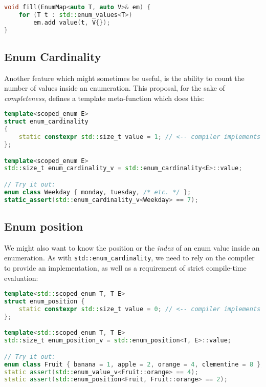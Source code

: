 \documentclass[
  format=manuscript,
  screen=true,
  review=false,
  nonacm=true,
  timestamp=true,
  balance=false]{acmart}
\begin{document}
\begin{lstlisting}[language=Cpp]
void fill(EnumMap<auto T, auto V>& em) {
    for (T t : std::enum_values<T>)
        em.add value(t, V{});
}
\end{lstlisting}


\subsection{Enum Cardinality}

Another feature which might sometimes be useful, is the ability to count the number
of values inside an enumeration. This proposal, for the sake of \textit{completeness},
defines a template meta-function which does this:\vspace{2mm}

\begin{lstlisting}[language=Cpp]
template<scoped_enum E>
struct enum_cardinality
{
    static constexpr std::size_t value = 1; // <-- compiler implements this
};

template<scoped_enum E>
std::size_t enum_cardinality_v = std::enum_cardinality<E>::value;

// Try it out:
enum class Weekday { monday, tuesday, /* etc. */ };
static_assert(std::enum_cardinality_v<Weekday> == 7);
\end{lstlisting}


\subsection{Enum position}

We might also want to know the position or the \textit{index} of an enum value
inside an enumeration. As with \texttt{std::enum\_cardinality}, we need to rely
on the compiler to provide an implementation, as well as a requirement of strict
compile-time evaluation:\vspace{2mm}

\begin{lstlisting}[language=Cpp]
template<std::scoped_enum T, T E>
struct enum_position {
    static constexpr std::size_t value = 0; // <-- compiler implements this
};

template<std::scoped_enum T, T E>
std::size_t enum_position_v = std::enum_position<T, E>::value;

// Try it out:
enum class Fruit { banana = 1, apple = 2, orange = 4, clementine = 8 };
static assert(std::enum_value_v<Fruit::orange> == 4);
static assert(std::enum_position<Fruit, Fruit::orange> == 2);
\end{lstlisting}
\end{document}
